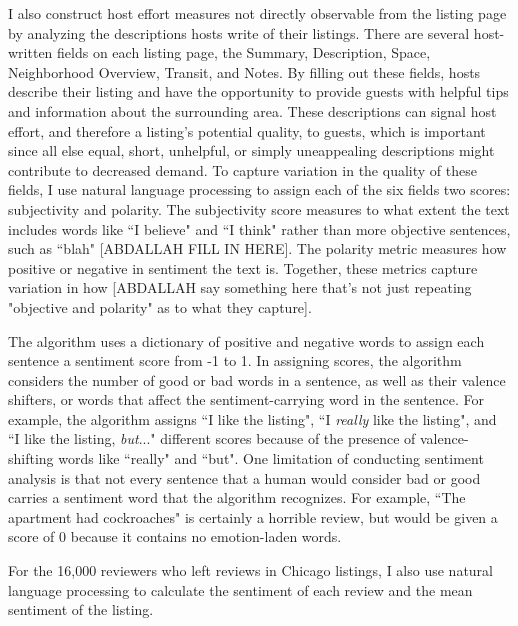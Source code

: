 I also construct host effort measures not directly observable from the listing page by analyzing the descriptions hosts write of their listings. There are several host-written fields on each listing page, the Summary, Description, Space, Neighborhood Overview, Transit, and Notes. By filling out these fields, hosts describe their listing and have the opportunity to provide guests with helpful tips and information about the surrounding area. These descriptions can signal host effort, and therefore a listing's potential quality, to guests, which is important since all else equal, short, unhelpful, or simply uneappealing descriptions might contribute to decreased demand. To capture variation in the quality of these fields, I use natural language processing to assign each of the six fields two scores: subjectivity and polarity. The subjectivity score measures to what extent the text includes words like ``I believe" and ``I think" rather than more objective sentences, such as ``blah" [ABDALLAH FILL IN HERE]. The polarity metric measures how positive or negative in sentiment the text is. Together, these metrics capture variation in how [ABDALLAH say something here that's not just repeating "objective and polarity" as to what they capture].  

The algorithm uses a dictionary of positive and negative words to assign each sentence a sentiment score from -1 to 1. In assigning scores, the algorithm considers the number of good or bad words in a sentence, as well as their valence shifters, or words that affect the sentiment-carrying word in the sentence. For example, the algorithm assigns ``I like the listing", ``I \textit{really} like the listing", and ``I like the listing, \textit{but}..." different scores because of the presence of valence-shifting words like ``really" and ``but". One limitation of conducting sentiment analysis is that not every sentence that a human would consider bad or good carries a sentiment word that the algorithm recognizes. For example, ``The apartment had cockroaches" is certainly a horrible review, but would be given a score of 0 because it contains no emotion-laden words. 

For the 16,000 reviewers who left reviews in Chicago listings, I also use natural language processing to calculate the sentiment of each review and the mean sentiment of the listing. 




\newpage	
\singlespacing

\doublespacing






